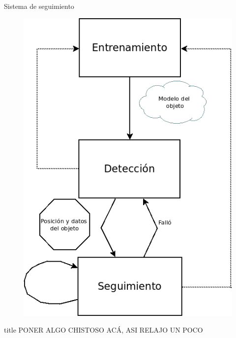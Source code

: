\documentclass[]{beamer}
\begin{document}
\begin{frame}[t]{Sistema de seguimiento}
    \begin{figure}[t]
        \centering
        \vspace{-13pt}
        \includegraphics[scale=0.3]{img/esquema_seguimiento.png}
    \end{figure}
\end{frame}


\begin{frame}[t]{title}
    PONER ALGO CHISTOSO ACÁ, ASI RELAJO UN POCO
\end{frame}
\end{document}
